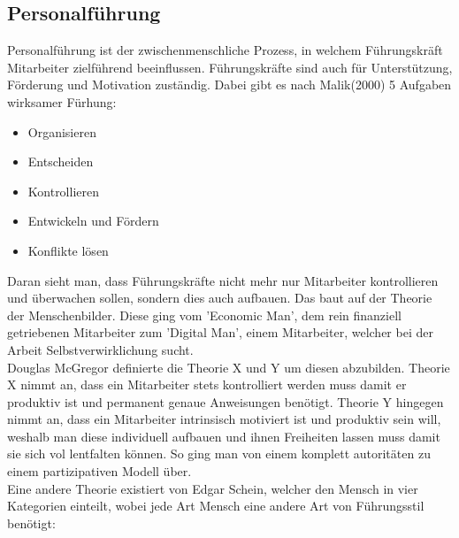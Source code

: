\documentclass{article}
\begin{document}
	 \subsection{Personalführung}
	 Personalführung ist der zwischenmenschliche Prozess, in welchem Führungskräft Mitarbeiter zielführend beeinflussen. Führungskräfte sind auch für Unterstützung, Förderung und Motivation zuständig. Dabei gibt es nach Malik(2000) 5 Aufgaben wirksamer Fürhung:
	 \begin{itemize}
	 	\item{Organisieren}
	 	\item{Entscheiden}
	 	\item{Kontrollieren}
	 	\item{Entwickeln und Fördern}
	 	\item{Konflikte lösen}
	 \end{itemize}
	 Daran sieht man, dass Führungskräfte nicht mehr nur Mitarbeiter kontrollieren und überwachen sollen, sondern dies auch aufbauen. Das baut auf der Theorie der Menschenbilder. Diese ging vom 'Economic Man', dem rein finanziell getriebenen Mitarbeiter zum 'Digital Man', einem Mitarbeiter, welcher bei der Arbeit Selbstverwirklichung sucht. \\
	 Douglas McGregor definierte die Theorie X und Y um diesen abzubilden. Theorie X nimmt an, dass ein Mitarbeiter stets kontrolliert werden muss damit er produktiv ist und permanent genaue Anweisungen benötigt. Theorie Y hingegen nimmt an, dass ein Mitarbeiter intrinsisch motiviert ist und produktiv sein will, weshalb man diese individuell aufbauen und ihnen Freiheiten lassen muss damit sie sich vol lentfalten können. So ging man von einem komplett autoritäten zu einem partizipativen Modell über. \\
	 Eine andere Theorie existiert von Edgar Schein, welcher den Mensch in vier Kategorien einteilt, wobei jede Art Mensch eine andere Art von Führungsstil benötigt:
\end{document}
